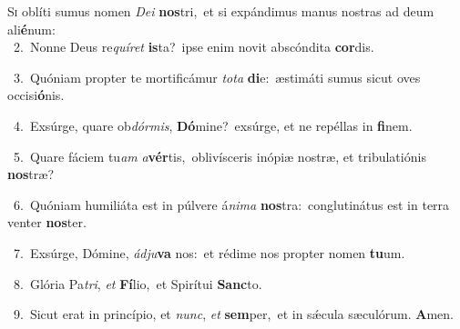 \lettrine{\initial\textcolor{\initialcolor}{S}}{i} oblíti sumus nomen \textit{De}\-\textit{i} \textbf{nos}\-tri,~\star et si expándimus manus nostras ad deum ali\-\textbf{é}\-num:\\
{\numbfont\textcolor{\numbcolor}{~2.}}~Nonne Deus re\-\textit{quí}\-\textit{ret} \textbf{is}\-ta?~\star ipse enim novit abscóndita \textbf{cor}\-dis.\par
{\numbfont\textcolor{\numbcolor}{~3.}}~Quóniam propter te mortificámur \textit{to}\-\textit{ta} \textbf{di}\-e:~\star æstimáti sumus sicut oves occisi\-\textbf{ó}\-nis.\par
{\numbfont\textcolor{\numbcolor}{~4.}}~Exsúrge, quare ob\-\textit{dór}\-\textit{mis}, \textbf{Dó}\-mine?~\star exsúrge, et ne repéllas in \textbf{fi}\-nem.\par
{\numbfont\textcolor{\numbcolor}{~5.}}~Quare fáciem tu\textit{am} \textit{a}\-\textbf{vér}tis,~\star oblivísceris inópiæ nostræ, et tribulatiónis \textbf{nos}\-træ?\par
{\numbfont\textcolor{\numbcolor}{~6.}}~Quóniam humiliáta est in púlvere á\-\textit{ni}\-\textit{ma} \textbf{nos}\-tra:~\star conglutinátus est in terra venter \textbf{nos}\-ter.\par
{\numbfont\textcolor{\numbcolor}{~7.}}~Exsúrge, Dómine, \textit{ád}\-\textit{ju}\textbf{va} nos:~\star et rédime nos propter nomen \textbf{tu}\-um.\par
{\numbfont\textcolor{\numbcolor}{~8.}}~Glória Pa\-\textit{tri}\-, \textit{et} \textbf{Fí}\-lio,~\star et Spirítui \textbf{Sanc}\-to.\par
{\numbfont\textcolor{\numbcolor}{~9.}}~Sicut erat in princípio, et \textit{nunc}\-, \textit{et} \textbf{sem}\-per,~\star et in sǽcula sæculórum. \textbf{A}\-men.\par
